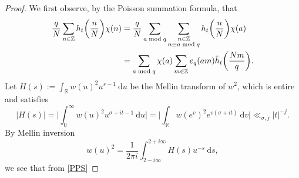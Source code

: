 \documentclass[12pt]{amsart}
\theoremstyle{definition}
\theoremstyle{plain}
\theoremstyle{remark}
\numberwithin{equation}{section}
\numberwithin{theorem}{section}
\newcommand{\Z}{\mathbb{Z}}
\numberwithin{equation}{section}
\begin{document}
	\begin{proof}
		We first observe, by the Poisson summation formula, that
		\begin{align}\label{PPS}
			\frac{q}{N}\sum_{n \in \mathbb {Z}}h_{t}\bigg(\frac{n}{N}\bigg)\chi(n)
			&=\frac{q}{N}\sum_{\substack{a \bmod q}}\sum_{\substack{n\in \Z \\ n \equiv a \bmod q}}h_{t}\bigg(\frac{n}{N}\bigg)\chi(a)
			\notag
			\\
			&=\sum_{\substack{a \bmod q}}\chi(a)\sum_{m \in \mathbb {Z}}e_q(am)\hat{h}_{t}\bigg(\frac{Nm}{q}\bigg).
		\end{align}
		Let $H(s):=\int_{\mathbb{R}}w(u)^{2}u^{s-1}\:\mathrm{d}u$ be the Mellin transform of $w^{2}$, which is entire and satisfies
		\begin{equation}\label{PrpW}
			|H(s)|=\bigg| \int_{0}^{\infty}w(u)^{2}u^{\sigma+it-1}\:\mathrm{d}u\bigg| =\bigg| \int_{\mathbb{R}}w(e^{v})^{2}e^{v(\sigma+it)}\:\mathrm{d}v\bigg|\ll_{\sigma,j}|t|^{-j}.
		\end{equation}
		By Mellin inversion
		\[w(u)^{2}=\frac{1}{2\pi i}\int_{2-i \infty}^{2+i \infty}H(s)u^{-s}\:\mathrm{d}s,\]
		we see that from \eqref{PPS}
		

\end{proof}
\end{document}
